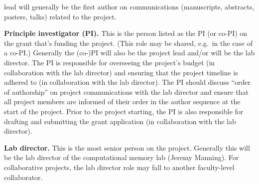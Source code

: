 \documentclass{tufte-book} %
\begin{document}
\begin{list}{P:~}{}
  lead will generally be the first author on communications
  (manuscripts, abstracts, posters, talks) related to
  the project.
\item \textbf{Principle investigator (PI).}  This is the person listed
  as the PI (or co-PI) on the grant that's funding the project.  (This
  role may be shared, e.g.\ in the case of a co-PI.)  Generally the
  (co-)PI will also be the project lead and/or will be the lab
  director.  The PI is responsible for overseeing the project's budget
  (in collaboration with the lab director) and ensuring that the
  project timeline is adhered to (in collaboration with the lab
  director).  The PI should discuss ``order of authorship'' on project
  communications with the lab director and ensure that all project
  members are informed of their order in the author sequence at the
  start of the project.  Prior to the project starting, the PI is also
  responsible for drafting and submitting the grant application (in
  collaboration with the lab director).
\item \textbf{Lab director.}  This is the most senior person on the
  project.  Generally this will be the lab director of the
  computational memory lab (Jeremy Manning).  For collaborative
  projects, the lab director role may fall to another faculty-level collaborator.
\end{list}


\newpage
\end{document}
